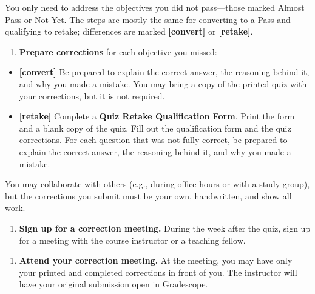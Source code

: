 \documentclass[11pt]{article}
\begin{document}
You only need to address the objectives you did not pass—those marked Almost Pass or Not Yet. The steps are mostly the same for converting to a Pass and qualifying to retake; differences are marked \textbf{[convert]} or \textbf{[retake]}.

\begin{samepage}
\begin{enumerate}
\item[1.] \textbf{Prepare corrections} for each objective you missed:
\end{enumerate}
\end{samepage}

\begin{samepage}
\begin{itemize}
\item \textbf{[convert]} Be prepared to explain the correct answer, the reasoning behind it, and why you made a mistake. You may bring a copy of the printed quiz with your corrections, but it is not required.
\end{itemize}
\end{samepage}

\begin{samepage}
\begin{itemize}
\item \textbf{[retake]} Complete a \textbf{Quiz Retake Qualification Form}. Print the form and a blank copy of the quiz. Fill out the qualification form and the quiz corrections. For each question that was not fully correct, be prepared to explain the correct answer, the reasoning behind it, and why you made a mistake.
\end{itemize}
\end{samepage}

You may collaborate with others (e.g., during office hours or with a study group), but the corrections you submit must be your own, handwritten, and show all work.

\begin{samepage}
\begin{enumerate}
\item[2.] \textbf{Sign up for a correction meeting.} During the week after the quiz, sign up for a meeting with the course instructor or a teaching fellow.
\end{enumerate}
\end{samepage}

\begin{samepage}
\begin{enumerate}
\item[3.] \textbf{Attend your correction meeting.} At the meeting, you may have only your printed and completed corrections in front of you. The instructor will have your original submission open in Gradescope.
\end{enumerate}
\end{samepage}
\end{document}
